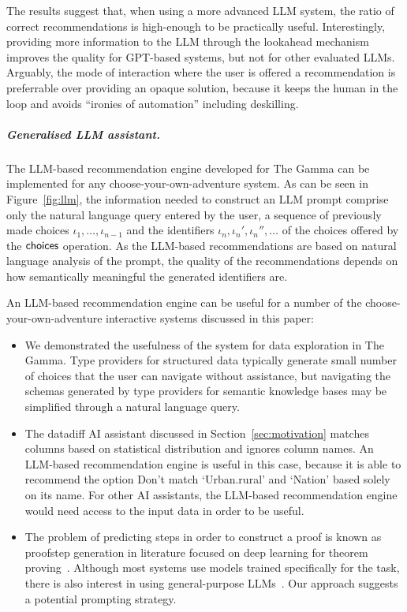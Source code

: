 \documentclass[anonymous, a4paper,UKenglish,cleveref, autoref, thm-restate]{lipics-v2021}
\newcommand{\ident}[1]{\textsf{#1}}
\newcommand{\choices}{\textnormal{\ident{choices}}}
\begin{document}
The results suggest that, when using a more advanced LLM system, the ratio of correct
recommendations is high-enough to be practically useful. Interestingly,  providing more
information to the LLM through the lookahead mechanism improves the quality for GPT-based systems,
but not for other evaluated LLMs. Arguably, the mode of interaction where the user is offered
a recommendation is preferrable over providing an opaque solution, because it keeps the human
in the loop \cite{sellen-2024-copilot} and avoids ``ironies of automation''
\cite{bainbridge-1983-ironies} including deskilling.

\subparagraph{Generalised LLM assistant.}
The LLM-based recommendation engine developed for The Gamma can be implemented for any
choose-your-own-adventure system. As can be seen in Figure~\ref{fig:llm}, the information needed
to construct an LLM prompt comprise only the natural language query entered by the user,
a sequence of previously made choices $\iota_1, \ldots, \iota_{n-1}$ and the identifiers
$\iota_n, \iota_n', \iota_n'', \ldots$ of the choices offered by the $\choices$ operation.
As the LLM-based recommendations are based on natural language analysis of the prompt,
the quality of the recommendations depends on how semantically meaningful the generated
identifiers are.

An LLM-based recommendation engine can be useful for a number of the choose-your-own-adventure
interactive systems discussed in this paper:

\begin{itemize}
\setlength{\itemsep}{5pt}
\item We demonstrated the usefulness of the system for data exploration in The Gamma.
  Type providers for structured data \cite{petricek-2016-fsdata} typically generate small number
  of choices that the user can navigate without assistance, but navigating the schemas generated by
  type providers for semantic knowledge bases \cite{syme-2012-inforich} may be simplified through a
  natural language query.
\item The datadiff AI assistant discussed in Section~\ref{sec:motivation} matches columns based
  on statistical distribution and ignores column names. An LLM-based recommendation engine is
  useful in this case, because it is able to recommend the option \ident{Don't match
  `Urban.rural' and `Nation'} based solely on its name. For other AI assistants, the LLM-based
  recommendation engine would need access to the input data in order to be useful.
\item The problem of predicting steps in order to construct a proof is known as
  proofstep generation in literature focused on deep learning for theorem
  proving~\cite{zhaoyu-2024-deep}. Although most systems use models trained specifically for the
  task, there is also interest in using general-purpose LLMs~\cite{zhang-2023-proofs}.
  Our approach suggests a potential prompting strategy.
\end{itemize}
\end{document}
